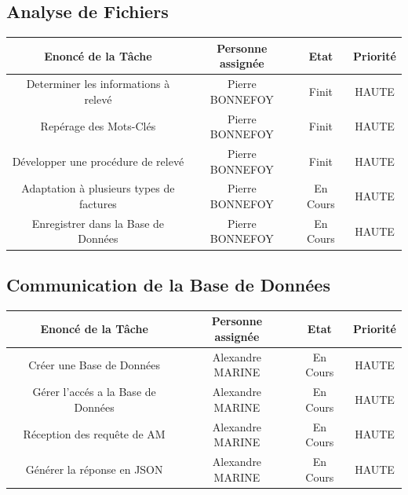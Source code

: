 \documentclass[a4paper, 11pt]{article}
\begin{document}
    \subsection{Analyse de Fichiers}
    \begin{center}
    \begin{tabular}{|c|c|c|c|}
        \hline
        Enoncé de la Tâche & Personne assignée & Etat & Priorité\\
        \hline
        \hline
        Determiner les informations à relevé  & Pierre BONNEFOY & Finit & HAUTE \\
        \hline
        Repérage des Mots-Clés & Pierre BONNEFOY & Finit & HAUTE  \\
        \hline
        Développer une procédure de relevé & Pierre BONNEFOY & Finit & HAUTE  \\
        \hline
        Adaptation à plusieurs types de factures & Pierre BONNEFOY & En Cours & HAUTE  \\
        \hline
        Enregistrer dans la Base de Données & Pierre BONNEFOY & En Cours & HAUTE  \\
        \hline
    \end{tabular}
    \end{center}

    \subsection{Communication de la Base de Données}
    \begin{center}
    \begin{tabular}{|c|c|c|c|}
        \hline
        Enoncé de la Tâche & Personne assignée & Etat & Priorité\\
        \hline
        \hline
        Créer une Base de Données  & Alexandre MARINE & En Cours & HAUTE \\
        \hline
        Gérer l'accés a la Base de Données  & Alexandre MARINE & En Cours & HAUTE \\
        \hline
        Réception des requête de AM  & Alexandre MARINE & En Cours & HAUTE \\
        \hline
        Générer la réponse en JSON  & Alexandre MARINE & En Cours & HAUTE \\
        \hline
    \end{tabular}
    \end{center}
\end{document}
